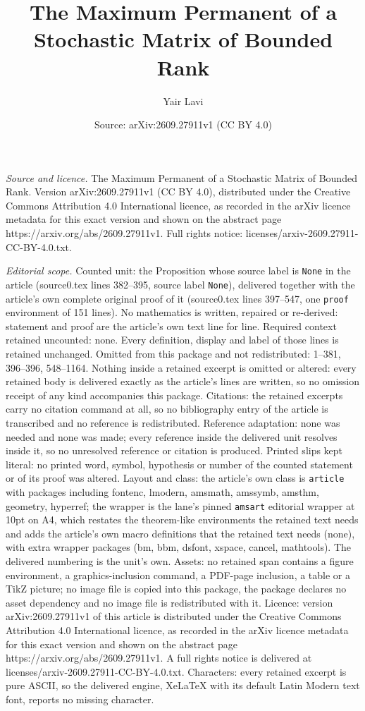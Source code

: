 \documentclass[10pt,a4paper]{amsart}
\title[The Maximum Permanent of a Stochastic Matrix of Bounded Rank]{The Maximum Permanent of a Stochastic Matrix of Bounded Rank}
\author{Yair Lavi}
\date{Source: arXiv:2609.27911v1 (CC BY 4.0)}
\begin{document}
\maketitle

\noindent\emph{Source and licence.} The Maximum Permanent of a Stochastic Matrix of Bounded Rank. Version arXiv:2609.27911v1 (CC BY 4.0), distributed under the Creative Commons Attribution 4.0 International licence, as recorded in the arXiv licence metadata for this exact version and shown on the abstract page https://arxiv.org/abs/2609.27911v1. Full rights notice: licenses/arxiv-2609.27911-CC-BY-4.0.txt.\par\smallskip

\noindent\textit{Editorial scope.} Counted unit: the Proposition whose source label is \texttt{None} in the article (source0.tex lines 382--395, source label \texttt{None}), delivered together with the article's own complete original proof of it (source0.tex lines 397--547, one \texttt{proof} environment of 151 lines). No mathematics is written, repaired or re-derived: statement and proof are the article's own text line for line. Required context retained uncounted: none. Every definition, display and label of those lines is retained unchanged. Omitted from this package and not redistributed: 1--381, 396--396, 548--1164. Nothing inside a retained excerpt is omitted or altered: every retained body is delivered exactly as the article's lines are written, so no omission receipt of any kind accompanies this package. Citations: the retained excerpts carry no citation command at all, so no bibliography entry of the article is transcribed and no reference is redistributed. Reference adaptation: none was needed and none was made; every reference inside the delivered unit resolves inside it, so no unresolved reference or citation is produced. Printed slips kept literal: no printed word, symbol, hypothesis or number of the counted statement or of its proof was altered. Layout and class: the article's own class is \texttt{article} with packages including fontenc, lmodern, amsmath, amssymb, amsthm, geometry, hyperref; the wrapper is the lane's pinned \texttt{amsart} editorial wrapper at 10pt on A4, which restates the theorem-like environments the retained text needs and adds the article's own macro definitions that the retained text needs (none), with extra wrapper packages (bm, bbm, dsfont, xspace, cancel, mathtools). The delivered numbering is the unit's own. Assets: no retained span contains a figure environment, a graphics-inclusion command, a PDF-page inclusion, a table or a TikZ picture; no image file is copied into this package, the package declares no asset dependency and no image file is redistributed with it. Licence: version arXiv:2609.27911v1 of this article is distributed under the Creative Commons Attribution 4.0 International licence, as recorded in the arXiv licence metadata for this exact version and shown on the abstract page https://arxiv.org/abs/2609.27911v1. A full rights notice is delivered at licenses/arxiv-2609.27911-CC-BY-4.0.txt. Characters: every retained excerpt is pure ASCII, so the delivered engine, XeLaTeX with its default Latin Modern text font, reports no missing character.
\end{document}
